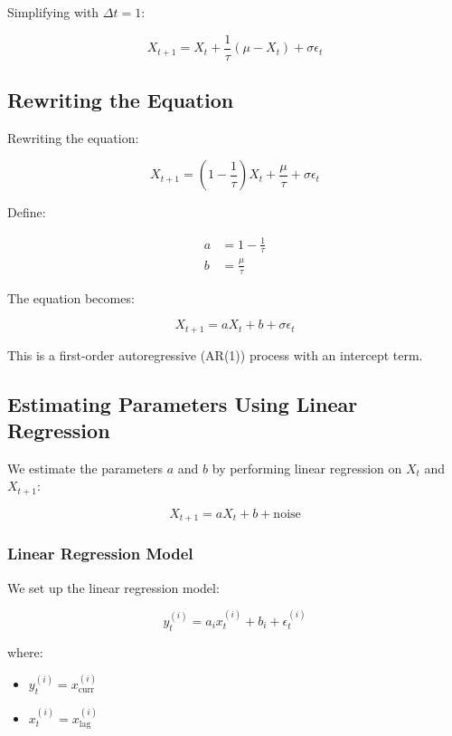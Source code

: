 \documentclass[12pt,article]{memoir}
\begin{document}
{Simplifying with $\Delta t = 1$:

\begin{equation}
X_{t+1} = X_t + \frac{1}{\tau} (\mu - X_t) + \sigma \epsilon_t
\end{equation}

\subsection{Rewriting the Equation}

Rewriting the equation:

\begin{equation}
X_{t+1} = \left(1 - \frac{1}{\tau}\right) X_t + \frac{\mu}{\tau} + \sigma \epsilon_t
\end{equation}

Define:

\begin{align}
a &= 1 - \frac{1}{\tau} \\
b &= \frac{\mu}{\tau}
\end{align}

The equation becomes:

\begin{equation}
X_{t+1} = a X_t + b + \sigma \epsilon_t
\end{equation}

This is a first-order autoregressive (AR(1)) process with an intercept term.

\subsection{Estimating Parameters Using Linear Regression}

We estimate the parameters $a$ and $b$ by performing linear regression on $X_t$ and $X_{t+1}$:

\begin{equation}
X_{t+1} = a X_t + b + \text{noise}
\end{equation}

\subsubsection{Linear Regression Model}

We set up the linear regression model:

\begin{equation}
y_t^{(i)} = a_i x_t^{(i)} + b_i + \epsilon_t^{(i)}
\end{equation}

where:
\begin{itemize}
    \item $y_t^{(i)} = x_{\text{curr}}^{(i)}$
    \item $x_t^{(i)} = x_{\text{lag}}^{(i)}$
\end{itemize}

}
\end{document}
